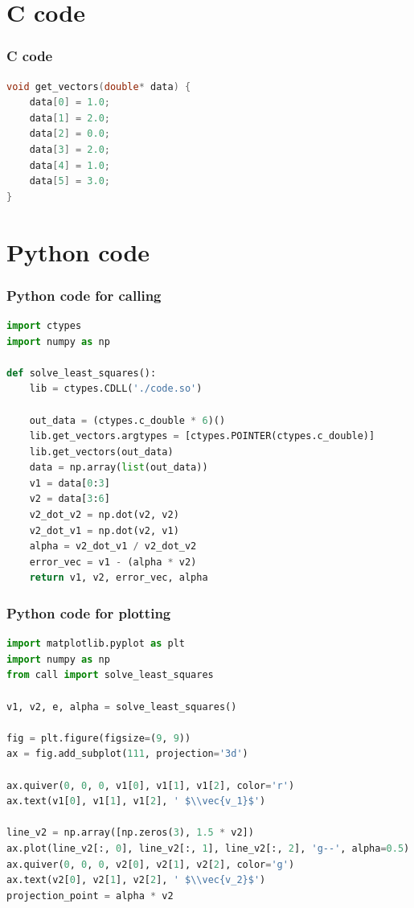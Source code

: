 \documentclass{beamer}
\theoremstyle{remark}
\let\vec\mathbf
\numberwithin{equation}{section}
\begin{document}
 \section{C code}
\begin{frame}[fragile]
\frametitle{C code }
\begin{lstlisting}[language=C]
void get_vectors(double* data) {
    data[0] = 1.0;
    data[1] = 2.0;
    data[2] = 0.0;
    data[3] = 2.0;
    data[4] = 1.0;
    data[5] = 3.0;
}
\end{lstlisting}
\end{frame}
\section{Python code}
 \begin{frame}[fragile]
\frametitle{Python code for calling }
\begin{lstlisting}[language=Python]
import ctypes
import numpy as np

def solve_least_squares():
    lib = ctypes.CDLL('./code.so')

    out_data = (ctypes.c_double * 6)()
    lib.get_vectors.argtypes = [ctypes.POINTER(ctypes.c_double)]
    lib.get_vectors(out_data)
    data = np.array(list(out_data))
    v1 = data[0:3]
    v2 = data[3:6]
    v2_dot_v2 = np.dot(v2, v2)
    v2_dot_v1 = np.dot(v2, v1)
    alpha = v2_dot_v1 / v2_dot_v2
    error_vec = v1 - (alpha * v2)
    return v1, v2, error_vec, alpha
\end{lstlisting}
\end{frame}
 \begin{frame}[fragile]
\frametitle{Python code for plotting }
\begin{lstlisting}[language=Python]
import matplotlib.pyplot as plt
import numpy as np
from call import solve_least_squares

v1, v2, e, alpha = solve_least_squares()

fig = plt.figure(figsize=(9, 9))
ax = fig.add_subplot(111, projection='3d')

ax.quiver(0, 0, 0, v1[0], v1[1], v1[2], color='r')
ax.text(v1[0], v1[1], v1[2], ' $\\vec{v_1}$')

line_v2 = np.array([np.zeros(3), 1.5 * v2])
ax.plot(line_v2[:, 0], line_v2[:, 1], line_v2[:, 2], 'g--', alpha=0.5)
ax.quiver(0, 0, 0, v2[0], v2[1], v2[2], color='g')
ax.text(v2[0], v2[1], v2[2], ' $\\vec{v_2}$')
projection_point = alpha * v2
\end{lstlisting}
\end{frame}
\end{document}

